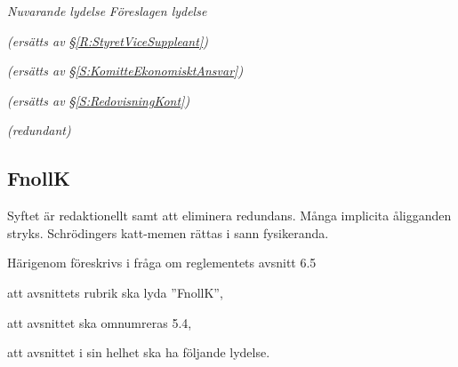 \documentclass{article}
\newenvironment{lydelse}
    {\begin{paracol}{2}%
        \emph{Nuvarande lydelse}%
        \switchcolumn%
        \emph{Föreslagen lydelse}%
    \end{paracol}%
    \begin{enumerate}[label=\thesubsection.\arabic*]%
    \begin{paracol}{2}%
    }{\end{paracol}\end{enumerate}}
\begin{document}
\begin{lydelse}
    \vspace{12.5em}
    
    \item[] \emph{(ersätts av \S \ref{R:StyretViceSuppleant})}
    
    \vspace{6em}
    \item[] \emph{(ersätts av \S \ref{S:KomitteEkonomisktAnsvar})}\vspace{1.2em}
    \item[] \emph{(ersätts av \S \ref{S:RedovisningKont})}
    
    \vspace{1.2em}
    \item[] \emph{(redundant)}
    
\end{lydelse}

\subsection{FnollK}
Syftet är redaktionellt samt att eliminera redundans.
Många implicita åligganden stryks.
Schrödingers katt-memen rättas i sann fysikeranda.

Härigenom föreskrivs i fråga om reglementets avsnitt 6.5

\begin{dels}
    \item att avsnittets rubrik ska lyda ''FnollK'',
    \item att avsnittet ska omnumreras 5.4,
    \item att avsnittet i sin helhet ska ha följande lydelse.
\end{dels}
\end{document}
